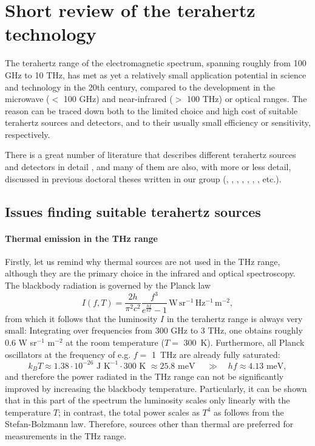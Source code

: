 \section{Short review of the terahertz technology}
The terahertz range of the electromagnetic spectrum, spanning roughly from 100 GHz to 10 THz, has met as yet a relatively small application potential in science and technology in the 20th century, compared to the development in the microwave ($<$ 100 GHz) and near-infrared ($>$ 100 THz) or optical ranges. The reason can be traced down both to the limited choice and high cost of suitable terahertz sources and detectors, and to their usually small efficiency or sensitivity, respectively. 

There is a great number of literature that describes different terahertz sources and detectors in detail \cite[pp. 155-158]{lee2008book}, %
and many of them are also, with more or less detail, discussed in previous doctoral theses written in our group (\cite[pp. 2-30]{pashkin2004phd}, \cite[pp. 19-25]{nemec2006phd}, \cite[pp. 7-26]{fekete2008phd}, \cite[pp. 11-21]{sibik2010dp}, \cite[pp. 31-45]{yahiaoui2011phd}, \cite[pp. 33-38]{mics2012phd}, \cite[pp. 25-33]{skoromets2013phd}, etc.).

\subsection{Issues finding suitable terahertz sources}
\paragraph{Thermal emission in the THz range}
Firstly, let us remind why thermal sources are not used in the THz range, although they are the primary choice in the infrared and optical spectroscopy. The blackbody radiation is governed by the Planck law %
\begin{equation}I(f, T) = \frac{2 h}{\pi^2 c^2}\frac{f^3}{e^{\frac{h f}{kT}}-1} \mathrm{\,W\,sr^{-1}\,Hz^{-1}\,m^{-2}}, \label{eq_planck}\end{equation}
from which it follows that the luminosity $I$ in the terahertz range is always very small: Integrating over frequencies from 300 GHz to 3 THz, one obtains roughly 0.6 W sr$^{-1}$ m$^{-2}$ at the room temperature ($T=$ 300~K).  Furthermore, all Planck oscillators at the frequency of e.g. $f =$ 1~THz are already fully saturated:
$$k_B T \approx 1.38\cdot 10^{-26} \text{ J K}^{-1} \cdot 300 \text{ K~} \approx 25.8 \text{ meV } \quad\gg\quad h f \approx 4.13 \text{ meV}, $$
and therefore the power radiated in the THz range can not be significantly improved by increasing the blackbody temperature. Particularly, it can be shown that in this part of the spectrum the luminosity scales only linearly with the temperature $T$; in contrast, the total power scales as $T^{4}$ as follows from the Stefan-Bolzmann law. Therefore, sources other than thermal are preferred for measurements in the THz range.

